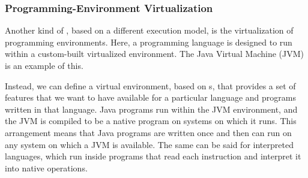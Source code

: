 \subsubsection{Programming-Environment Virtualization}\label{subsubsec:Programming_Lang_Virtualization}
Another kind of , based on a different execution model, is the virtualization of programming environments.
Here, a programming language is designed to run within a custom-built virtualized environment.
The Java Virtual Machine (JVM) is an example of this.

Instead, we can define a virtual environment, based on s, that provides a set of features that we want to have available for a particular language and programs written in that language.
Java programs run within the JVM environment, and the JVM is compiled to be a native program on systems on which it runs.
This arrangement means that Java programs are written once and then can run on any system on which a JVM is available.
The same can be said for interpreted languages, which run inside programs that read each instruction and interpret it into native operations.


